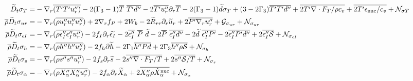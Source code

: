 \documentclass[10pt,paper=a4]{report}
\newcommand{\eht}{\overline}
\newcommand{\fht}{\widetilde}
\begin{document}
\begin{table}[!h]
\label{tab:rans-variances2}
\begin{align}
\fht{D}_t \sigma_T = & -\nabla_r \eht{(T' T' u''_r)} - 2(\Gamma_3 -1)\eht{T} \ \eht{T'd''} - 2\eht{T'u''_r} \partial_r \eht{T} - 2(\Gamma_3-1)\fht{d}\sigma_T + (3-2\Gamma_3)\eht{T'T'd''} + \eht{2 T' \nabla \cdot F_T/ \rho c_v} + \eht{2 T' \epsilon_{\rm nuc} / c_v} + {\mathcal N_{\sigma T}}  \\
\eht{\rho} \fht{D}_t \sigma_{ur} = & -\nabla_r ( \eht{\rho u''_r u''_r u''_r} ) + 2 \nabla_r f_P + 2 W_b - 2\fht{R}_{rr}\partial_r \fht{u}_r + 2 \overline{P'\nabla_r u''_r} + {\mathcal G_{\sigma_{ur}}} + {\mathcal N_{\sigma_{ur}}} \\
\eht{\rho} \fht{D}_t \sigma_{\epsilon I} = &  -\nabla_r (\eht{\rho \epsilon''_I \epsilon''_I u''_r} ) - 2 f_I \partial_r \fht{\epsilon_I} - 2\overline{\epsilon''_I}\ \eht{P} \ \fht{d} - 2\eht{P} \ \eht{\epsilon''_I d''} - 2\fht{d} \ \eht{\epsilon''_I P'} - 2\overline{\epsilon''_I P' d''} + 2\eht{\epsilon''_I {\mathcal S}} + {\mathcal N_{\sigma_{\epsilon I}}} \\
\eht{\rho} \fht{D}_t \sigma_{h} = & -\nabla_r (\eht{\rho h'' h'' u''_r} )  - 2 f_h \partial \widetilde{h} - 2\Gamma_1 \overline{h''Pd} + 2\Gamma_3 \overline{h'' \rho \mathcal{S}} + {\mathcal N_{\sigma_{h}}} \\
\eht{\rho} \fht{D}_t \sigma_s = & -\nabla_r ( \eht{\rho s'' s'' u''_r} ) - 2 f_s \partial_r \fht{s} - 2\eht{s'' \nabla \cdot F_T / T} + 2 \eht{s'' {\mathcal S} / T} + {\mathcal N_{\sigma_{s}}}\\
\eht{\rho} \fht{D}_t \sigma_\alpha = & -\nabla_r (\eht{\rho X''_\alpha X''_\alpha u''_r} ) - 2 f_\alpha \partial_r \fht{X}_\alpha + 2 \eht{X''_\alpha \rho \dot{X}_\alpha^{\rm nuc}} + {\mathcal N_{\sigma_\alpha}}
\end{align}
\end{table}


\end{document}
